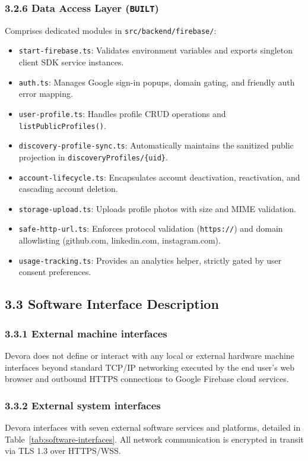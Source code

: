 \documentclass[11pt,letterpaper]{article}
\begin{document}
\subsubsection*{3.2.6 Data Access Layer (\texttt{BUILT})}
Comprises dedicated modules in \texttt{src/backend/firebase/}:
\begin{itemize}[leftmargin=*,noitemsep]
\item \texttt{start-firebase.ts}: Validates environment variables and exports singleton client SDK service instances.
\item \texttt{auth.ts}: Manages Google sign-in popups, domain gating, and friendly auth error mapping.
\item \texttt{user-profile.ts}: Handles profile CRUD operations and \texttt{listPublicProfiles()}.
\item \texttt{discovery-profile-sync.ts}: Automatically maintains the sanitized public projection in \texttt{discoveryProfiles/}\allowbreak\texttt{\{uid\}}.
\item \texttt{account-lifecycle.ts}: Encapsulates account deactivation, reactivation, and cascading account deletion.
\item \texttt{storage-upload.ts}: Uploads profile photos with size and MIME validation.
\item \texttt{safe-http-url.ts}: Enforces protocol validation (\texttt{https://}) and domain allowlisting (github.com, linkedin.com, instagram.com).
\item \texttt{usage-tracking.ts}: Provides an analytics helper, strictly gated by user consent preferences.
\end{itemize}

\newpage
\subsection*{3.3 Software Interface Description}

\subsubsection*{3.3.1 External machine interfaces}
Devora does not define or interact with any local or external hardware machine interfaces beyond standard TCP/IP networking executed by the end user's web browser and outbound HTTPS connections to Google Firebase cloud services.

\subsubsection*{3.3.2 External system interfaces}
Devora interfaces with seven external software services and platforms, detailed in Table~\ref{tab:software-interfaces}. All network communication is encrypted in transit via TLS 1.3 over HTTPS/WSS.
\end{document}
